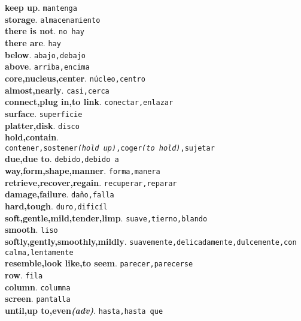 \documentclass[twocolumn]{article}
\begin{document}
	\textsf{\textbf{keep up}}. \texttt{mantenga}\\
	\textsf{\textbf{storage}}. \texttt{almacenamiento}\\
	\textsf{\textbf{there is not}}. \texttt{no hay}\\
	\textsf{\textbf{there are}}. \texttt{hay}\\
	\textsf{\textbf{below}}. \texttt{abajo,debajo}\\
	\textsf{\textbf{above}}. \texttt{arriba,encima}\\
	\textsf{\textbf{core,nucleus,center}}. \texttt{n\'ucleo,centro}\\
	\textsf{\textbf{almost,nearly}}. \texttt{casi,cerca}\\
	\textsf{\textbf{connect,plug in,to link}}. \texttt{conectar,enlazar}\\
	\textsf{\textbf{surface}}. \texttt{superficie}\\
	\textsf{\textbf{platter,disk}}. \texttt{disco}\\
	\textsf{\textbf{hold,contain}}.\\\texttt{contener,sostener{\scriptsize \textsl{(hold up)}},coger{\scriptsize \textsl{(to hold)}},sujetar}\\
	\textsf{\textbf{due,due to}}. \texttt{debido,debido a}\\
	\textsf{\textbf{way,form,shape,manner}}. \texttt{forma,manera}\\
	\textsf{\textbf{retrieve,recover,regain}}. \texttt{recuperar,reparar}\\
	\textsf{\textbf{damage,failure}}. \texttt{da\~no,falla}\\
	\textsf{\textbf{hard,tough}}. \texttt{duro,dific\'il}\\
	\textsf{\textbf{soft,gentle,mild,tender,limp}}. \texttt{suave,tierno,blando}\\
	\textsf{\textbf{smooth}}. \texttt{liso}\\
	\textsf{\textbf{softly,gently,smoothly,mildly}}. \texttt{suavemente,delicadamente,dulcemente,con calma,lentamente}\\
	\textsf{\textbf{resemble,look like,to seem}}. \texttt{parecer,parecerse}\\
	\textsf{\textbf{row}}. \texttt{fila}\\
	\textsf{\textbf{column}}. \texttt{columna}\\
	\textsf{\textbf{screen}}. \texttt{pantalla}\\
	\textsf{\textbf{until,up to,even{\scriptsize \textsl{(adv)}}}}. \texttt{hasta,hasta que}\\
\end{document}
